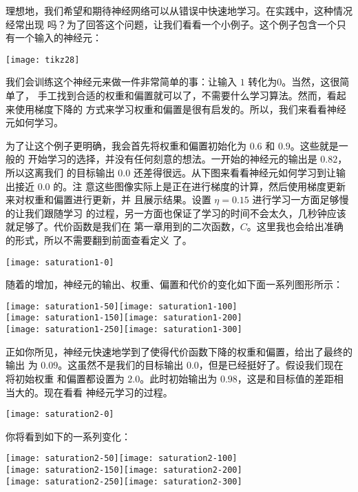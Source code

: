 理想地，我们希望和期待神经网络可以从错误中快速地学习。在实践中，这种情况经常出现
吗？为了回答这个问题，让我们看看一个小例子。这个例子包含一个只有一个输入的神经元：

\begin{center}
  \texttt{[image: tikz28]}
\end{center}

我们会训练这个神经元来做一件非常简单的事：让输入 $1$ 转化为$0$。当然，这很简单了，
手工找到合适的权重和偏置就可以了，不需要什么学习算法。然而，看起来使用梯度下降的
方式来学习权重和偏置是很有启发的。所以，我们来看看神经元如何学习。

为了让这个例子更明确，我会首先将权重和偏置初始化为 $0.6$ 和 $0.9$。这些就是一般的
开始学习的选择，并没有任何刻意的想法。一开始的神经元的输出是 $0.82$，所以这离我们
的目标输出 $0.0$ 还差得很远。从下图来看看神经元如何学习到让输出接近 $0.0$ 的。注
意这些图像实际上是正在进行梯度的计算，然后使用梯度更新来对权重和偏置进行更新，并
且展示结果。设置\learningrate{} $\eta=0.15$ 进行学习一方面足够慢的让我们跟随学习
的过程，另一方面也保证了学习的时间不会太久，几秒钟应该就足够了。代价函数是我们在
第一章用到的二次函数，$C$。这里我也会给出准确的形式，所以不需要翻到前面查看定义
了。
\begin{center}
  \texttt{[image: saturation1-0]}
\end{center}
随着\epochs{}的增加，神经元的输出、权重、偏置和代价的变化如下面一系列图形所示：
\begin{center}
    \texttt{[image: saturation1-50]}\texttt{[image: saturation1-100]}\\
    \texttt{[image: saturation1-150]}\texttt{[image: saturation1-200]}\\
    \texttt{[image: saturation1-250]}\texttt{[image: saturation1-300]}
\end{center}

正如你所见，神经元快速地学到了使得代价函数下降的权重和偏置，给出了最终的输出
为 $0.09$。这虽然不是我们的目标输出 $0.0$，但是已经挺好了。假设我们现在将初始权重
和偏置都设置为 $2.0$。此时初始输出为 $0.98$，这是和目标值的差距相当大的。现在看看
神经元学习的过程。
\begin{center}
  \texttt{[image: saturation2-0]}
\end{center}
你将看到如下的一系列变化：\label{saturation2_anchor}
\begin{center}
  \texttt{[image: saturation2-50]}\texttt{[image: saturation2-100]}\\
  \texttt{[image: saturation2-150]}\texttt{[image: saturation2-200]}\\
  \texttt{[image: saturation2-250]}\texttt{[image: saturation2-300]}
\end{center}

